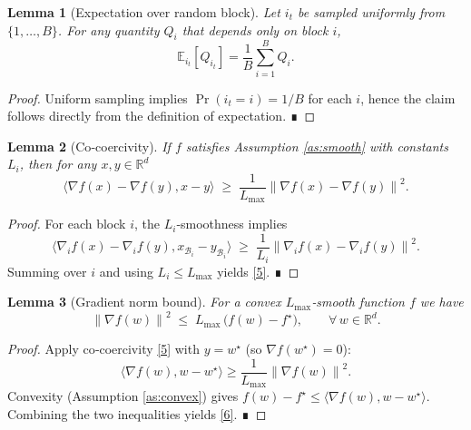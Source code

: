 \documentclass{article}
\newtheorem{lemma}{Lemma}
\newcommand{\E}{\mathbb{E}}
\newcommand{\R}{\mathbb{R}}
\newcommand{\norm}[1]{\left\lVert #1\right\rVert}
\newcommand{\ip}[2]{\langle #1 , #2\rangle}
\begin{document}
\begin{lemma}[Expectation over random block]\label{lem:expect}
Let $i_{t}$ be sampled uniformly from $\{1,\dots ,B\}$. For any quantity $Q_{i}$ that depends only on block $i$,
\[
\E_{i_{t}}[Q_{i_{t}}]=\frac{1}{B}\sum_{i=1}^{B} Q_{i}.
\tag{4}
\]
\end{lemma}
\begin{proof}
Uniform sampling implies $\Pr(i_{t}=i)=1/B$ for each $i$, hence the claim follows directly from the definition of expectation. ∎
\end{proof}

\begin{lemma}[Co‑coercivity]\label{lem:coercive}
If $f$ satisfies Assumption \ref{as:smooth} with constants $L_i$, then for any $x,y\in\R^{d}$
\[
\ip{\nabla f(x)-\nabla f(y)}{x-y}\;\ge\;\frac{1}{L_{\max}}\norm{\nabla f(x)-\nabla f(y)}^{2}.
\tag{5}
\]
\end{lemma}
\begin{proof}
For each block $i$, the $L_i$‑smoothness implies
\[
\ip{\nabla_i f(x)-\nabla_i f(y)}{x_{\mathcal{B}_i}-y_{\mathcal{B}_i}}
\;\ge\;\frac{1}{L_i}\norm{\nabla_i f(x)-\nabla_i f(y)}^{2}.
\]
Summing over $i$ and using $L_i\le L_{\max}$ yields \eqref{5}. ∎
\end{proof}

\begin{lemma}[Gradient norm bound]\label{lem:gradnorm}
For a convex $L_{\max}$‑smooth function $f$ we have
\[
\norm{\nabla f(w)}^{2}\;\le\;L_{\max}\,\bigl(f(w)-f^{\star}\bigr),\qquad\forall\,w\in\R^{d}.
\tag{6}
\]
\end{lemma}
\begin{proof}
Apply co‑coercivity \eqref{5} with $y=w^{\star}$ (so $\nabla f(w^{\star})=0$):
\[
\ip{\nabla f(w)}{w-w^{\star}}\ge\frac{1}{L_{\max}}\norm{\nabla f(w)}^{2}.
\]
Convexity (Assumption \ref{as:convex}) gives $f(w)-f^{\star}\le\ip{\nabla f(w)}{w-w^{\star}}$.
Combining the two inequalities yields \eqref{6}. ∎
\end{proof}
\end{document}
